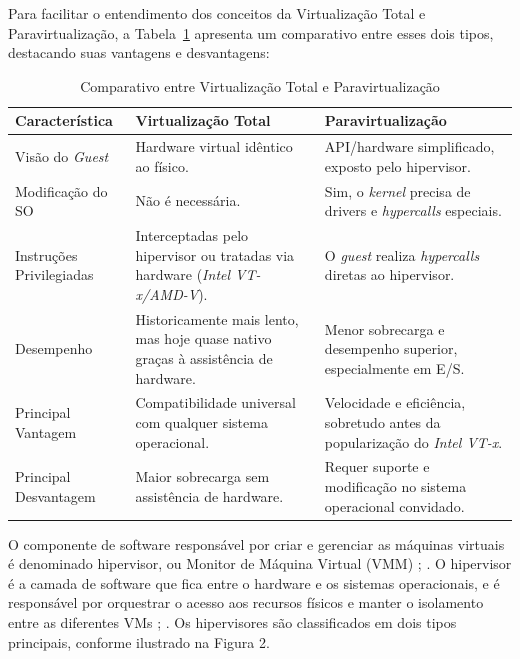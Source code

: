 Para facilitar o entendimento dos conceitos da Virtualização Total e Paravirtualização, a Tabela~\ref{tab:comparativo_virtualizacao} apresenta um comparativo entre esses dois tipos, destacando suas vantagens e desvantagens:
\begin{table}[H]
    \centering
    \caption{Comparativo entre Virtualização Total e Paravirtualização}
    \label{tab:comparativo_virtualizacao}
    \begin{tabular}{|>{\raggedright\arraybackslash}p{}|
                    >{\raggedright\arraybackslash}p{}|
                    >{\raggedright\arraybackslash}p{}|}
        \hline
        \textbf{Característica} & \textbf{Virtualização Total} & \textbf{Paravirtualização} \\ \hline
        Visão do \textit{Guest} & Hardware virtual idêntico ao físico. 
                                & API/hardware simplificado, exposto pelo hipervisor. \\ \hline
        Modificação do SO       & Não é necessária. 
                                & Sim, o \textit{kernel} precisa de drivers e \textit{hypercalls} especiais. \\ \hline
        Instruções Privilegiadas & Interceptadas pelo hipervisor ou tratadas via hardware (\textit{Intel VT-x/AMD-V}). 
                                & O \textit{guest} realiza \textit{hypercalls} diretas ao hipervisor. \\ \hline
        Desempenho              & Historicamente mais lento, mas hoje quase nativo graças à assistência de hardware. 
                                & Menor sobrecarga e desempenho superior, especialmente em E/S. \\ \hline
        Principal Vantagem      & Compatibilidade universal com qualquer sistema operacional. 
                                & Velocidade e eficiência, sobretudo antes da popularização do \textit{Intel VT-x}. \\ \hline
        Principal Desvantagem   & Maior sobrecarga sem assistência de hardware. 
                                & Requer suporte e modificação no sistema operacional convidado. \\ \hline
    \end{tabular}
\end{table}
O componente de software responsável por criar e gerenciar as máquinas virtuais é denominado hipervisor, ou Monitor de Máquina Virtual (VMM) \cite{chawla2025}; \cite{carissimi2008}. O hipervisor é a camada de software que fica entre o hardware e os sistemas operacionais, e é responsável por orquestrar o acesso aos recursos físicos e manter o isolamento entre as diferentes VMs \cite{chawla2025}; \cite{carissimi2008}. Os hipervisores são classificados em dois tipos principais, conforme ilustrado na Figura 2.

